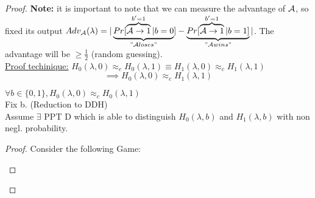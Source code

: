 \begin{proof}
    \textbf{Note:} it is important to note that we can measure the advantage of $\mathcal{A}$, so fixed its output $Adv_{\mathcal{A}}(\lambda)=|\underbrace{Pr[\overbrace{\mathcal{A}\rightarrow 1}^{b'=1}|b=0}_{"\mathcal{A} loses"}]-\underbrace{Pr[\overbrace{\mathcal{A}\rightarrow 1}^{b'=1}|b=1]}_{"\mathcal{A} wins"}|$. The advantage will be $\geq \frac{1}{2}$ (random guessing).\\

    \underline{Proof techinique:}
    $H_0(\lambda,0) \approx_c H_0(\lambda,1)\equiv H_1(\lambda,0) \approx_c H_1(\lambda,1)$
    $$\implies H_0(\lambda,0) \approx_c H_1(\lambda,1)$$

    \begin{lemma}
        $\forall b \in \{0,1\}, H_0(\lambda,0) \approx_c H_0(\lambda,1)$\\
        Fix b. (Reduction to DDH)\\
        Assume $\exists$ PPT D which is able to distinguish $H_0(\lambda,b)$ and $H_1(\lambda,b)$ with non negl. probability.
    \end{lemma}

    \newpage
    \begin{proof}

        Consider the following Game:

        \begin{figure}[h!]
            \centering
            \sdinit{}
        \end{figure}


\end{proof}
\end{proof}
